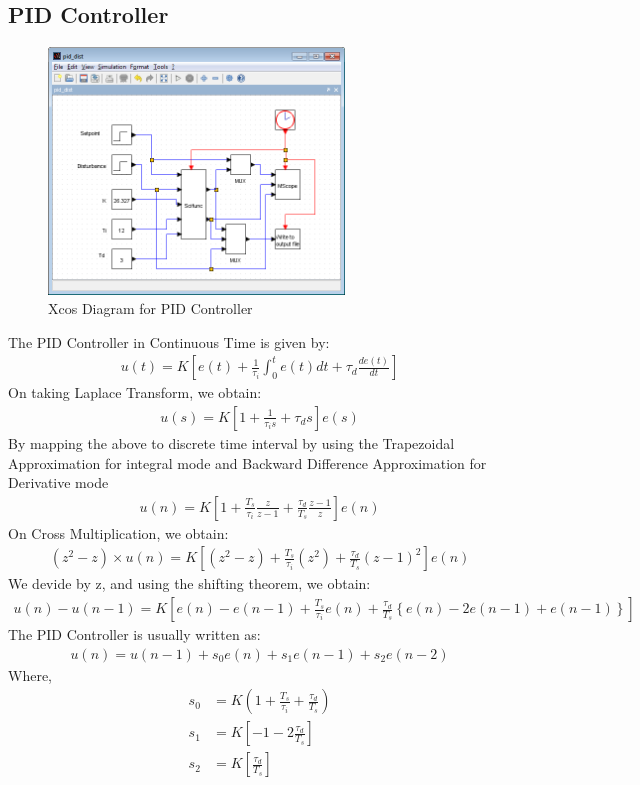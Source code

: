 \subsection{PID Controller}
\begin{figure}[h]
\centering
	\includegraphics[width =0.7\textwidth]{Vikas_self/report_tex/implementation/pid_dist.png}
		\caption{Xcos Diagram for PID Controller}
	\label{PID}
\end{figure}

The PID Controller in Continuous Time is given by:
\begin{align*}
	u(t) = K \left[e(t) + \frac 1{\tau_i}\int_0^t e(t)dt + \tau_d \frac{de(t)}{dt}\right]
\end{align*}
On taking Laplace Transform, we obtain:
\begin{align*}
	u(s) = K \left[1 + \frac 1{\tau_i s} + \tau_d s\right]e(s)
\end{align*}
By mapping the above to discrete time interval by using the Trapezoidal Approximation for integral mode and Backward Difference Approximation for Derivative mode
\begin{align*}
	u(n) = K \left[1 + \frac{T_s}{\tau_i} \frac{z}{z-1} + \frac{\tau_d}{T_s} \frac{z-1}{z}\right]e(n)
\end{align*}
On Cross Multiplication, we obtain:
\begin{align*}
	(z^2-z)\times u(n) = K \left[(z^2-z) + \frac{T_s}{\tau_i} (z^2) + \frac{\tau_d}{T_s} (z-1)^2\right]e(n)
\end{align*}
We devide by z, and using the shifting theorem, we obtain:
\begin{align*}
	 u(n) - u(n-1) = K \left[e(n) - e(n-1) + \frac{T_s}{\tau_i} e(n) + \frac{\tau_d}{T_s}\left\{e(n) - 2e(n-1) + e(n-1)\right\}\right]
\end{align*}
The PID Controller is usually written as:
\begin{align}
	 u(n) = u(n-1) + s_0 e(n) + s_1 e(n-1) + s_2 e(n-2)
\end{align}
Where,
\begin{align*}
s_0 &= K\left(1+ \frac{T_s}{\tau_i} + \frac{\tau_d}{T_s}\right)\\
s_1 &= K\left[-1 - 2\frac{\tau_d}{T_s}\right]\\
s_2 &= K\left[\frac{\tau_d}{T_s}\right]
\end{align*}

